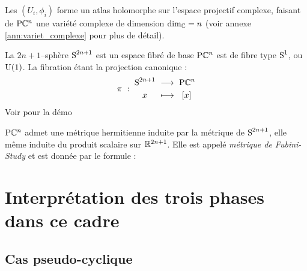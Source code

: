 Les $(U_i,\phi_i)$ forme un atlas holomorphe sur l'espace projectif complexe, faisant de $\PC{n}$ une variété complexe de dimension $\dim[\C] = n$ (voir annexe \ref{ann:variet_complexe} pour plus de détail).

\begin{proposition}
	La $2n+1$--sphère $\S{2n+1}$ est un espace fibré de base $\PC{n}$ est de fibre type $\S{1}$, ou $\U{1}$. La fibration étant la projection canonique :
	\[\pi\ :\ \begin{aligned}\S{2n+1}\ &\lr\ \PC{n} \\ x\quad\ &\lmt\ \ [x]\end{aligned}\]
	Voir \cite{lafontaine_introduction_2015} pour la démo
\end{proposition}


\begin{proposition}
	$\PC{n}$ admet une métrique hermitienne induite par la métrique de $\S{2n+1}$, elle même induite du produit scalaire sur $\R^{2n+1}$. Elle est appelé \emph{métrique de Fubini-Study} et est donnée par le formule :
	\[\]
\end{proposition}


\section{Interprétation des trois phases dans ce cadre}

\subsection{Cas pseudo-cyclique}








